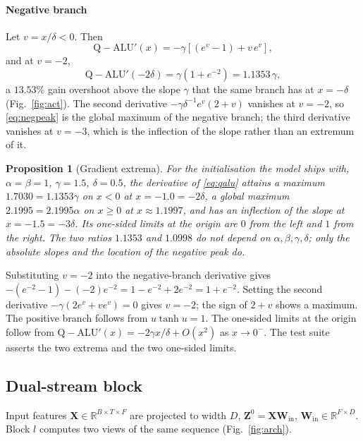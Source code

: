 \documentclass[conference]{IEEEtran}
\newtheorem{proposition}{Proposition}
\newcommand{\QALU}{\mathrm{Q-ALU}}
\newcommand{\R}{\mathbb{R}}
\begin{document}
\paragraph{Negative branch}
Let $v=x/\delta<0$. Then
\begin{equation}
\QALU'(x)=-\gamma\left[\left(e^{v}-1\right)+v\,e^{v}\right],
\end{equation}
and at $v=-2$,
\begin{equation}
\QALU'(-2\delta)=\gamma\left(1+e^{-2}\right)=1.1353\,\gamma ,
\label{eq:negpeak}
\end{equation}
a $13.53\%$ gain overshoot above the slope $\gamma$ that the same branch has at
$x=-\delta$ (Fig.~\ref{fig:act}). The second derivative
$-\gamma\delta^{-1}e^{v}(2+v)$ vanishes at $v=-2$, so \eqref{eq:negpeak} is the
global maximum of the negative branch; the third derivative vanishes at $v=-3$,
which is the inflection of the slope rather than an extremum of it.

\begin{proposition}[Gradient extrema]
For the initialisation the model ships with, $\alpha=\beta=1$, $\gamma=1.5$,
$\delta=0.5$, the derivative of \eqref{eq:qalu} attains a maximum
$1.7030=1.1353\gamma$ on $x<0$ at $x=-1.0=-2\delta$, a global maximum
$2.1995=2.1995\alpha$ on $x\ge0$ at $x\approx1.1997$, and has an inflection of
the slope at $x=-1.5=-3\delta$. Its one-sided limits at the origin are $0$ from
the left and $1$ from the right. The two ratios $1.1353$ and $1.0998$ do not
depend on $\alpha,\beta,\gamma,\delta$; only the absolute slopes and the
location of the negative peak do.
\end{proposition}

\begin{IEEEproof}
Substituting $v=-2$ into the negative-branch derivative gives
$-(e^{-2}-1)-(-2)e^{-2}=1-e^{-2}+2e^{-2}=1+e^{-2}$. Setting the second
derivative $-\gamma\left(2e^{v}+ve^{v}\right)=0$ gives $v=-2$; the sign of
$2+v$ shows a maximum. The positive branch follows from $u\tanh u=1$. The
one-sided limits at the origin follow from
$\QALU'(x)=-2\gamma x/\delta+O(x^{2})$ as $x\to0^{-}$.
The test suite asserts the two extrema and the two one-sided limits.
\end{IEEEproof}

\subsection{Dual-stream block}
Input features $\mathbf{X}\in\R^{B\times T\times F}$ are projected to width
$D$, $\mathbf{Z}^{0}=\mathbf{X}\mathbf{W}_{\mathrm{in}}$,
$\mathbf{W}_{\mathrm{in}}\in\R^{F\times D}$. Block $l$ computes two views of
the same sequence (Fig.~\ref{fig:arch}).
\end{document}

